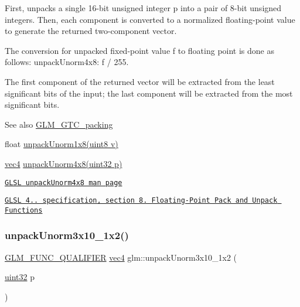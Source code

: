 First, unpacks a single 16-\/bit unsigned integer p into a pair of 8-\/bit unsigned integers. Then, each component is converted to a normalized floating-\/point value to generate the returned two-\/component vector.

The conversion for unpacked fixed-\/point value f to floating point is done as follows\+: unpack\+Unorm4x8\+: f / 255.

The first component of the returned vector will be extracted from the least significant bits of the input; the last component will be extracted from the most significant bits.

\begin{DoxySeeAlso}{See also}
\hyperlink{group__gtc__packing}{G\+L\+M\+\_\+\+G\+T\+C\+\_\+packing} 

float \hyperlink{group__gtc__packing_ga32f3f2642df2ea87449d59fb614a8305}{unpack\+Unorm1x8(uint8 v)} 

\hyperlink{group__core__types_ga5881b1b022d7fd1b7218f5916532dd02}{vec4} \hyperlink{group__core__func__packing_ga7f903259150b67e9466f5f8edffcd197}{unpack\+Unorm4x8(uint32 p)} 

\href{http://www.opengl.org/sdk/docs/manglsl/xhtml/unpackUnorm4x8.xml}{\tt G\+L\+SL unpack\+Unorm4x8 man page} 

\href{http://www.opengl.org/registry/doc/GLSLangSpec.4.20.8.pdf}{\tt G\+L\+SL 4.. specification, section 8. Floating-\/\+Point Pack and Unpack Functions} 
\end{DoxySeeAlso}
\mbox{\label{group__gtc__packing_gaf69ace2b5e9234f8afb4e99c3df1193d}} 
\subsubsection{\texorpdfstring{unpack\+Unorm3x10\+\_\+1x2()}{unpackUnorm3x10\_1x2()}}
{\footnotesize\ttfamily \hyperlink{setup_8hpp_a33fdea6f91c5f834105f7415e2a64407}{G\+L\+M\+\_\+\+F\+U\+N\+C\+\_\+\+Q\+U\+A\+L\+I\+F\+I\+ER} \hyperlink{group__core__types_ga5881b1b022d7fd1b7218f5916532dd02}{vec4} glm\+::unpack\+Unorm3x10\+\_\+1x2 (\begin{DoxyParamCaption}\item[{\hyperlink{group__gtc__type__precision_ga202b6a53c105fcb7e531f9b443518451}{uint32}}]{p }\end{DoxyParamCaption})}

